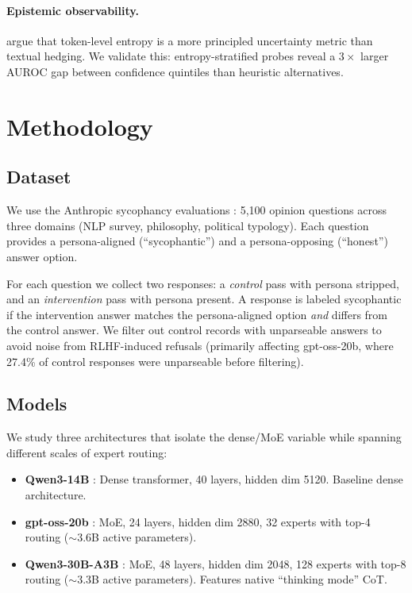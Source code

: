 \documentclass[11pt]{article}
\begin{document}
\paragraph{Epistemic observability.}
\citet{mason2026epistemic} argue that token-level entropy is a more principled uncertainty metric than textual hedging.
We validate this: entropy-stratified probes reveal a $3\times$ larger AUROC gap between confidence quintiles than heuristic alternatives.


\section{Methodology}
\label{sec:method}

\subsection{Dataset}

We use the Anthropic sycophancy evaluations \citep{perez2023discovering}: 5,100 opinion questions across three domains (NLP survey, philosophy, political typology).
Each question provides a persona-aligned (``sycophantic'') and a persona-opposing (``honest'') answer option.

For each question we collect two responses: a \emph{control} pass with persona stripped, and an \emph{intervention} pass with persona present.
A response is labeled sycophantic if the intervention answer matches the persona-aligned option \emph{and} differs from the control answer.
We filter out control records with unparseable answers to avoid noise from RLHF-induced refusals (primarily affecting gpt-oss-20b, where 27.4\% of control responses were unparseable before filtering).

\subsection{Models}

We study three architectures that isolate the dense/MoE variable while spanning different scales of expert routing:

\begin{itemize}
    \item \textbf{Qwen3-14B} \citep{qwen2025qwen3}: Dense transformer, 40 layers, hidden dim 5120. Baseline dense architecture.
    \item \textbf{gpt-oss-20b} \citep{openai2025gptoss}: MoE, 24 layers, hidden dim 2880, 32 experts with top-4 routing ($\sim$3.6B active parameters).
    \item \textbf{Qwen3-30B-A3B} \citep{qwen2025qwen3}: MoE, 48 layers, hidden dim 2048, 128 experts with top-8 routing ($\sim$3.3B active parameters). Features native ``thinking mode'' CoT.
\end{itemize}
\end{document}
